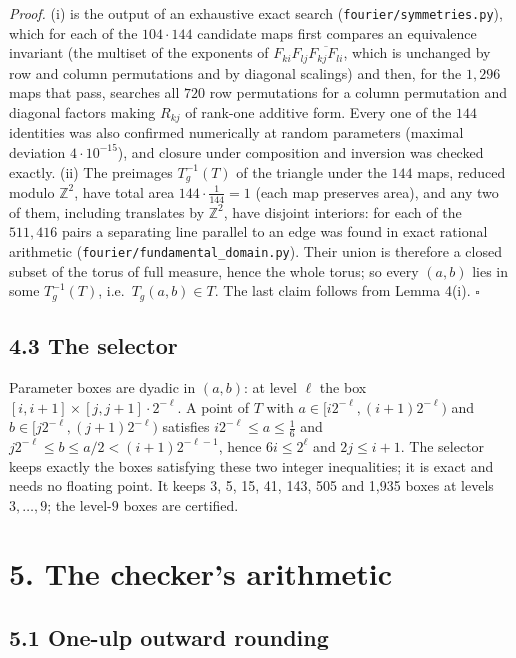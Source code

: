 \documentclass[
  11pt,
]{article}
\begin{document}
\emph{Proof.} (i) is the output of an exhaustive exact search
(\texttt{fourier/symmetries.py}), which for each of the \(104\cdot144\)
candidate maps first compares an equivalence invariant (the multiset of
the exponents of \(F_{ki}F_{lj}\overline{F_{kj}F_{li}}\), which is
unchanged by row and column permutations and by diagonal scalings) and
then, for the \(1{,}296\) maps that pass, searches all \(720\) row
permutations for a column permutation and diagonal factors making
\(R_{kj}\) of rank-one additive form. Every one of the \(144\)
identities was also confirmed numerically at random parameters (maximal
deviation \(4\cdot10^{-15}\)), and closure under composition and
inversion was checked exactly. (ii) The preimages \(T_g^{-1}(T)\) of the
triangle under the \(144\) maps, reduced modulo \(\mathbb Z^2\), have
total area \(144\cdot\tfrac1{144}=1\) (each map preserves area), and any
two of them, including translates by \(\mathbb Z^2\), have disjoint
interiors: for each of the \(511{,}416\) pairs a separating line
parallel to an edge was found in exact rational arithmetic
(\texttt{fourier/fundamental\_domain.py}). Their union is therefore a
closed subset of the torus of full measure, hence the whole torus; so
every \((a,b)\) lies in some \(T_g^{-1}(T)\), i.e.~\(T_g(a,b)\in T\).
The last claim follows from Lemma 4(i). \(\square\)

\subsection{4.3 The selector}\label{the-selector-1}

Parameter boxes are dyadic in \((a,b)\): at level \(\ell\) the box
\([i,i+1]\times[j,j+1]\cdot2^{-\ell}\). A point of \(T\) with
\(a\in[i2^{-\ell},(i+1)2^{-\ell})\) and
\(b\in[j2^{-\ell},(j+1)2^{-\ell})\) satisfies
\(i2^{-\ell}\le a\le\tfrac16\) and
\(j2^{-\ell}\le b\le a/2<(i+1)2^{-\ell-1}\), hence \(6i\le2^\ell\) and
\(2j\le i+1\). The selector keeps exactly the boxes satisfying these two
integer inequalities; it is exact and needs no floating point. It keeps
3, 5, 15, 41, 143, 505 and 1,935 boxes at levels \(3,\dots,9\); the
level-\(9\) boxes are certified.

\section{5. The checker's arithmetic}\label{the-checkers-arithmetic}

\subsection{5.1 One-ulp outward
rounding}\label{one-ulp-outward-rounding}
\end{document}
